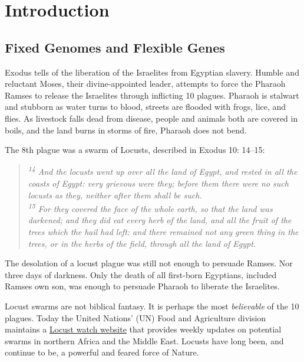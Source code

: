 \chapter{Introduction}  \label{Chapter1} 
\section{Fixed Genomes and Flexible Genes}\label{sec:Fixed Genomes and Flexible Genes} 

  Exodus tells of the liberation of the Israelites from Egyptian slavery. Humble and reluctant Moses, their divine-appointed leader, attempts to force the Pharaoh Ramses to release the Israelites through inflicting 10 plagues. Pharaoh is stalwart and stubborn as water turns to blood, streets are flooded with frogs, lice, and flies. As livestock falls dead from disease, people and animals both are covered in boils, and the land burns in storms of fire, Pharaoh does not bend.

  The 8th plague was a swarm of Locusts, described in Exodus 10: 14–15:

  \begin{quote}
    \itshape 
    \singlespacing
    \textsuperscript{14} And the locusts went up over all the land of Egypt, and rested in all the coasts of Egypt: very grievous were they; before them there were no such locusts as they, neither after them shall be such.\\
    \textsuperscript{15} For they covered the face of the whole earth, so that the land was darkened; and they did eat every herb of the land, and all the fruit of the trees which the hail had left: and there remained not any green thing in the trees, or in the herbs of the field, through all the land of Egypt.
    \end{quote}

  The desolation of a locust plague was still not enough to persuade Ramses. Nor three days of darkness. Only the death of all first-born Egyptians, included Ramses own son, was enough to persuade Pharaoh to liberate the Israelites.

  Locust swarms are not biblical fantasy. It is perhaps the most \textit{believable} of the 10 plagues. Today the United Nations' (UN) Food and Agriculture division maintains a \href{http://www.fao.org/ag/locusts/en/info/info/news/index.html}{Locust watch website} that provides weekly updates on potential swarms in northern Africa and the Middle East. Locusts have long been, and continue to be, a powerful and feared force of Nature.

